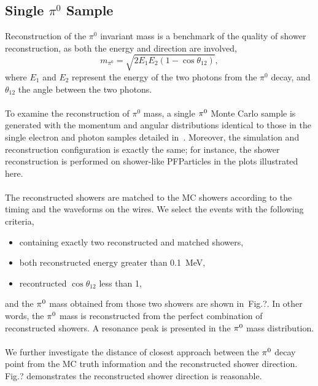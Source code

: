 \subsection{Single $\pi^0$ Sample}
\label{sec:single_pi0}

Reconstruction of the $\pi^0$ invariant mass is a benchmark of
the quality of shower reconstruction, as both the energy and
direction are involved,
\begin{equation}
\label{eq:pi0_mass}
m_{\pi^0} = \sqrt{2E_1 E_2(1-\cos\theta_{12})},
\end{equation}
where $E_1$ and $E_2$ represent the energy of the two photons
from the $\pi^0$ decay, and $\theta_{12}$ the angle between the
two photons.\\
\\
To examine the reconstruction of $\pi^0$ mass, a single ${\pi}^0$
Monte Carlo sample is generated with the momentum and
angular distributions identical to those in the single electron
and photon samples detailed in~.
Moreover, the simulation and reconstruction configuration is
exactly the same; for instance,
the shower reconstruction is performed on shower-like PFParticles
in the plots illustrated here.\\
\\
The reconstructed showers are matched to the MC showers according
to the timing and the waveforms on the wires.
We select the events with the following criteria,
\begin{itemize}
\item containing exactly two reconstructed and matched showers,
\item both reconstructed energy greater than 0.1~MeV,
\item recontructed $\cos\theta_{12}$ less than 1,
\end{itemize}
and the ${\pi}^0$ mass obtained from those two showers
are shown in~Fig.?.
In other words, the ${\pi}^0$ mass is reconstructed from the perfect
combination of reconstructed showers.
A resonance peak is presented in the ${\pi}^0$ mass distribution.\\
\\
We further investigate the distance of closest approach between
the ${\pi}^0$ decay point from the MC truth information and
the reconstructed shower direction.
Fig.? demonstrates the reconstructed shower direction is reasonable.
